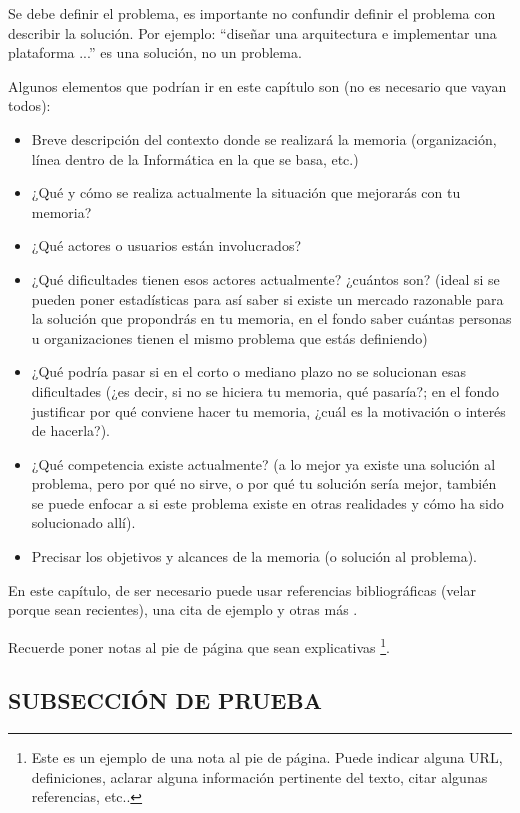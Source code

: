 
Se debe definir el problema, es importante no confundir definir el problema con describir la solución. Por ejemplo: ``diseñar una arquitectura e implementar una plataforma ...'' es una solución, no un problema.

Algunos elementos que podrían ir en este capítulo son (no es necesario que vayan todos):
\begin{itemize}
    \item Breve descripción del contexto donde se realizará la memoria (organización, línea dentro de la Informática en la que se basa, etc.)
    \item ¿Qué y cómo se realiza actualmente la situación que mejorarás con tu memoria?
    \item ¿Qué actores o usuarios están involucrados?
    \item ¿Qué dificultades tienen esos actores actualmente? ¿cuántos son? (ideal si se pueden poner estadísticas para así saber si existe un mercado razonable para la solución que propondrás en tu memoria, en el fondo saber cuántas personas u organizaciones tienen el mismo problema que estás definiendo)
    \item ¿Qué podría pasar si en el corto o mediano plazo no se solucionan esas dificultades (¿es decir, si no se hiciera tu memoria, qué pasaría?; en el fondo justificar por qué conviene hacer tu memoria, ¿cuál es la motivación o interés de hacerla?).
    \item ¿Qué competencia existe actualmente? (a lo mejor ya existe una solución al problema, pero por qué no sirve, o por qué tu solución sería mejor, también se puede enfocar a si este problema existe en otras realidades y cómo ha sido solucionado allí).
    \item Precisar los objetivos y alcances de la memoria (o solución al problema).
\end{itemize}

En este capítulo, de ser necesario puede usar referencias bibliográficas (velar porque sean recientes), una cita de ejemplo \cite{schwab2002cure} y otras más \cite{georget1994study,beaumont1990patient}.

Recuerde poner notas al pie de página que sean explicativas \footnote{Este es un ejemplo de una nota al pie de página. Puede indicar alguna URL, definiciones, aclarar alguna información pertinente del texto, citar algunas referencias, etc..}.

\subsection{SUBSECCIÓN DE PRUEBA}

